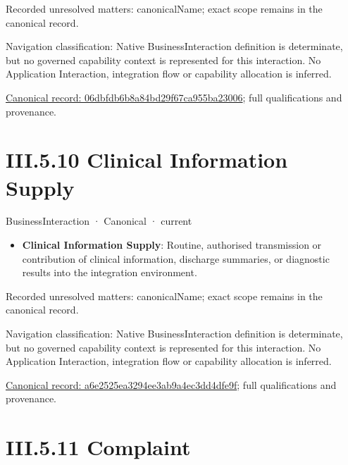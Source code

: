 {\small Recorded unresolved matters: canonicalName; exact scope remains in the canonical record.}\par
{\small Navigation classification: Native BusinessInteraction definition is determinate, but no governed capability context is represented for this interaction. No Application Interaction, integration flow or capability allocation is inferred.}\par
{\footnotesize \href{../../../../../../../../continuum/business/business-interaction/06dbfdb6b8a84bd29f67ca955ba23006.md}{Canonical record: 06dbfdb6b8a84bd29f67ca955ba23006}; full qualifications and provenance.}\par
\section*{III.5.10 Clinical Information Supply}
\label{navigation:III.5.10}

\label{element:a6e2525ea3294ee3ab9a4ec3dd4dfe9f}
{\small BusinessInteraction · Canonical · current}\par

\begin{itemize}


\item \textbf{Clinical Information Supply}: Routine, authorised transmission or contribution of clinical information, discharge summaries, or diagnostic results into the integration environment.

\end{itemize}

{\small Recorded unresolved matters: canonicalName; exact scope remains in the canonical record.}\par
{\small Navigation classification: Native BusinessInteraction definition is determinate, but no governed capability context is represented for this interaction. No Application Interaction, integration flow or capability allocation is inferred.}\par
{\footnotesize \href{../../../../../../../../continuum/business/business-interaction/a6e2525ea3294ee3ab9a4ec3dd4dfe9f.md}{Canonical record: a6e2525ea3294ee3ab9a4ec3dd4dfe9f}; full qualifications and provenance.}\par
\section*{III.5.11 Complaint}
\label{navigation:III.5.11}

